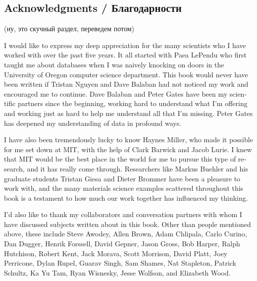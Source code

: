\documentclass{book}
\theoremstyle{theoremENG}
\theoremstyle{lemmaENG}
\theoremstyle{propositionENG}
\theoremstyle{corollaryENG}
\theoremstyle{factENG}
\theoremstyle{remarkENG}
\theoremstyle{exampleENG}
\theoremstyle{warningENG}
\theoremstyle{questionENG}
\theoremstyle{guessENG}
\theoremstyle{answerENG}
\theoremstyle{constructionENG}
\theoremstyle{rulesENG}
\theoremstyle{excENG}
\theoremstyle{appENG}
\theoremstyle{definitionENG}
\theoremstyle{notationENG}
\theoremstyle{conjectureENG}
\theoremstyle{postulateENG}
\theoremstyle{theoremRUS}
\theoremstyle{lemmaRUS}
\theoremstyle{propositionRUS}
\theoremstyle{corollaryRUS}
\theoremstyle{factRUS}
\theoremstyle{remarkRUS}
\theoremstyle{exampleRUS}
\theoremstyle{warningRUS}
\theoremstyle{questionRUS}
\theoremstyle{guessRUS}
\theoremstyle{answerRUS}
\theoremstyle{constructionRUS}
\theoremstyle{rulesRUS}
\theoremstyle{excRUS}
\theoremstyle{appRUS}
\theoremstyle{definitionRUS}
\theoremstyle{notationRUS}
\theoremstyle{conjectureRUS}
\theoremstyle{postulateRUS}
\begin{document}
\begin{english}

\section{Acknowledgments / Благодарности}

\begin{russian} (ну, это скучный раздел, переведем потом) \end{russian}

I would like to express my deep appreciation for the many scientists who I have worked with over the past five years. It all started with Paea LePendu who first taught me about databases when I was naively knocking on doors in the University of Oregon computer science department. This book would never have been written if Tristan Nguyen and Dave Balaban had not noticed my work and encouraged me to continue. Dave Balaban and Peter Gates have been my scientific partners since the beginning, working hard to understand what I'm offering and working just as hard to help me understand all that I'm missing. Peter Gates has deepened my understanding of data in profound ways.

\begin{russian} \end{russian}

I have also been tremendously lucky to know Haynes Miller, who made it possible for me set down at MIT, with the help of Clark Barwick and Jacob Lurie. I knew that MIT would be the best place in the world for me to pursue this type of research, and it has really come through. Researchers like Markus Buehler and his graduate students Tristan Giesa and Dieter Brommer have been a pleasure to work with, and the many materials science examples scattered throughout this book is a testament to how much our work together has influenced my thinking.

\begin{russian} \end{russian}

I'd also like to thank my collaborators and conversation partners with whom I have discussed subjects written about in this book. Other than people mentioned above, these include Steve Awodey, Allen Brown, Adam Chlipala, Carlo Curino, Dan Dugger, Henrik Forssell, David Gepner, Jason Gross, Bob Harper, Ralph Hutchison, Robert Kent, Jack Morava, Scott Morrison, David Platt, Joey Perricone, Dylan Rupel, Guarav Singh, Sam Shames, Nat Stapleton, Patrick Schultz, Ka Yu Tam, Ryan Wisnesky, Jesse Wolfson, and Elizabeth Wood.


\end{english}
\end{document}
